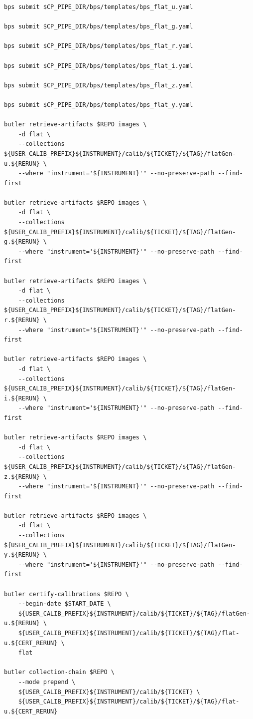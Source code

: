 \documentclass[DM,authoryear,toc]{lsstdoc}
\begin{document}
\begin{footnotesize}
\begin{verbatim}
bps submit $CP_PIPE_DIR/bps/templates/bps_flat_u.yaml

bps submit $CP_PIPE_DIR/bps/templates/bps_flat_g.yaml

bps submit $CP_PIPE_DIR/bps/templates/bps_flat_r.yaml

bps submit $CP_PIPE_DIR/bps/templates/bps_flat_i.yaml

bps submit $CP_PIPE_DIR/bps/templates/bps_flat_z.yaml

bps submit $CP_PIPE_DIR/bps/templates/bps_flat_y.yaml

butler retrieve-artifacts $REPO images \
    -d flat \
    --collections ${USER_CALIB_PREFIX}${INSTRUMENT}/calib/${TICKET}/${TAG}/flatGen-u.${RERUN} \
    --where "instrument='${INSTRUMENT}'" --no-preserve-path --find-first

butler retrieve-artifacts $REPO images \
    -d flat \
    --collections ${USER_CALIB_PREFIX}${INSTRUMENT}/calib/${TICKET}/${TAG}/flatGen-g.${RERUN} \
    --where "instrument='${INSTRUMENT}'" --no-preserve-path --find-first

butler retrieve-artifacts $REPO images \
    -d flat \
    --collections ${USER_CALIB_PREFIX}${INSTRUMENT}/calib/${TICKET}/${TAG}/flatGen-r.${RERUN} \
    --where "instrument='${INSTRUMENT}'" --no-preserve-path --find-first

butler retrieve-artifacts $REPO images \
    -d flat \
    --collections ${USER_CALIB_PREFIX}${INSTRUMENT}/calib/${TICKET}/${TAG}/flatGen-i.${RERUN} \
    --where "instrument='${INSTRUMENT}'" --no-preserve-path --find-first

butler retrieve-artifacts $REPO images \
    -d flat \
    --collections ${USER_CALIB_PREFIX}${INSTRUMENT}/calib/${TICKET}/${TAG}/flatGen-z.${RERUN} \
    --where "instrument='${INSTRUMENT}'" --no-preserve-path --find-first

butler retrieve-artifacts $REPO images \
    -d flat \
    --collections ${USER_CALIB_PREFIX}${INSTRUMENT}/calib/${TICKET}/${TAG}/flatGen-y.${RERUN} \
    --where "instrument='${INSTRUMENT}'" --no-preserve-path --find-first

butler certify-calibrations $REPO \
    --begin-date $START_DATE \
    ${USER_CALIB_PREFIX}${INSTRUMENT}/calib/${TICKET}/${TAG}/flatGen-u.${RERUN} \
    ${USER_CALIB_PREFIX}${INSTRUMENT}/calib/${TICKET}/${TAG}/flat-u.${CERT_RERUN} \
    flat

butler collection-chain $REPO \
    --mode prepend \
    ${USER_CALIB_PREFIX}${INSTRUMENT}/calib/${TICKET} \
    ${USER_CALIB_PREFIX}${INSTRUMENT}/calib/${TICKET}/${TAG}/flat-u.${CERT_RERUN}


\end{verbatim}
\end{footnotesize}
\end{document}
